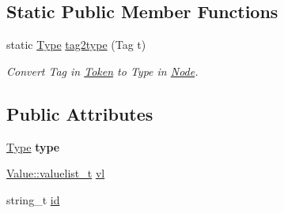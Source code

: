 \subsection*{Static Public Member Functions}
\begin{DoxyCompactItemize}
\item 
static \hyperlink{class_d_f_p_1_1_node_a31d945c7278c3587d6d28c76b0f1ae81}{Type} \hyperlink{class_d_f_p_1_1_node_ac282e4329fb1fcfb791093b40ef4f2aa}{tag2type} (Tag t)\hypertarget{class_d_f_p_1_1_node_ac282e4329fb1fcfb791093b40ef4f2aa}{}\label{class_d_f_p_1_1_node_ac282e4329fb1fcfb791093b40ef4f2aa}

\begin{DoxyCompactList}\small\item\em Convert Tag in \hyperlink{class_d_f_p_1_1_token}{Token} to Type in \hyperlink{class_d_f_p_1_1_node}{Node}. \end{DoxyCompactList}\end{DoxyCompactItemize}
\subsection*{Public Attributes}
\begin{DoxyCompactItemize}
\item 
\hyperlink{class_d_f_p_1_1_node_a31d945c7278c3587d6d28c76b0f1ae81}{Type} {\bfseries type}\hypertarget{class_d_f_p_1_1_node_a51f2b604b13572692ed9579ee7001a8a}{}\label{class_d_f_p_1_1_node_a51f2b604b13572692ed9579ee7001a8a}

\item 
\hyperlink{class_d_f_p_1_1_value_a2ca981be3c47c7d23213c08379d3c947}{Value\+::valuelist\+\_\+t} \hyperlink{class_d_f_p_1_1_node_aa9e4196de8f357a432508d1bf171a011}{vl}
\item 
string\+\_\+t \hyperlink{class_d_f_p_1_1_node_a7fb4f15a2c154c960f64797fc887fc75}{id}
\end{DoxyCompactItemize}
